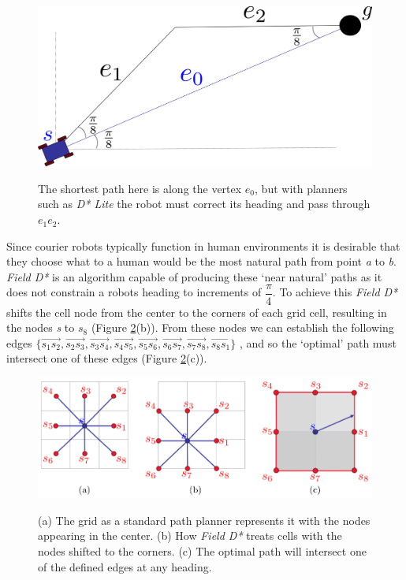 \begin{figure}[htbp]

\center \includegraphics[width=400pt]{illustrations/shortest_path}\\
\caption{The shortest path here is along the vertex $e_{0}$, but with planners such as \textit{D* Lite} the robot must correct its heading and pass through $e_{1}e_{2}$. \cite{FIELD}} 
\label{Figure: Shortest Path.}

\end{figure}

\newpage

\noindent
Since courier robots typically function in human environments it is desirable that they choose what to a human would be the most natural path from point \textit{a} to \textit{b}. \textit{Field D*} \cite{FIELD2} is an algorithm capable of producing these `near natural' paths as it does not constrain a robots heading to increments of $\dfrac{\pi}{4}$. To achieve this \textit{Field D*} shifts the cell node from the center to the corners of each grid cell, resulting in the nodes \textit{s} to $s_{8}$ (Figure \ref{Figure: Optimal.}(b)). From these nodes we can establish the following edges $\lbrace \overrightarrow{s_{1}s_{2}}, \overrightarrow{s_{2}s_{3}}, \overrightarrow{s_{3}s_{4}}, \overrightarrow{s_{4}s_{5}}, \overrightarrow{s_{5}s_{6}}, \overrightarrow{s_{6}s_{7}}, \overrightarrow{s_{7}s_{8}}, \overrightarrow{s_{8}s_{1}} \rbrace$ \cite{FIELD}, and so the `optimal' path must intersect one of these edges (Figure \ref{Figure: Optimal.}(c)).

\begin{figure}[htbp]

\center \includegraphics[width=350pt]{illustrations/nodes}\\
\caption{(a) The grid as a standard path planner represents it with the nodes appearing in the center. (b) How \textit{Field D*} treats cells with the nodes shifted to the corners. (c) The optimal path will intersect one of the defined edges at any heading. \cite{FIELD}} 
\label{Figure: Optimal.}

\end{figure}

